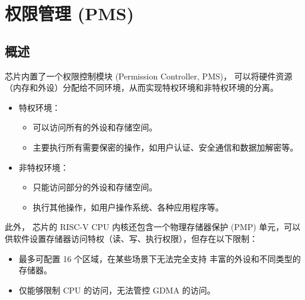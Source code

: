 \documentclass[main\_\_CN.tex]{subfiles}
\begin{document}

\ifglobal
\else
    {\let\clearpage\relax \listoftodos}
    \tableofcontents
\fi



\chapter{权限管理 (PMS)}
\label{mod:permctrl}
\hypertarget{permctrl}{}




\section{概述}

\chipname{} 芯片内置了一个权限控制模块 (Permission Controller, PMS)， 可以将硬件资源（内存和外设）分配给不同环境，从而实现特权环境和非特权环境的分离。

\begin{itemize}
    \item 特权环境：
    \begin{itemize}
        \item 可以访问所有的外设和存储空间。
        \item 主要执行所有需要保密的操作，如用户认证、安全通信和数据加解密等。
    \end{itemize}
    \item 非特权环境：
    \begin{itemize}
        \item 只能访问部分的外设和存储空间。
        \item 执行其他操作，如用户操作系统、各种应用程序等。
    \end{itemize}
\end{itemize}


此外，\chipname{} 芯片的 RISC-V CPU 内核还包含一个物理存储器保护 (PMP) 单元，可以供软件设置存储器访问特权（读、写、执行权限），但存在以下限制：
    \begin{itemize}
        \item 最多可配置 16 个区域，在某些场景下无法完全支持 \chipname{} 丰富的外设和不同类型的存储器。
        \item 仅能够限制 CPU 的访问，无法管控 GDMA 的访问。
    \end{itemize}
\end{document}
